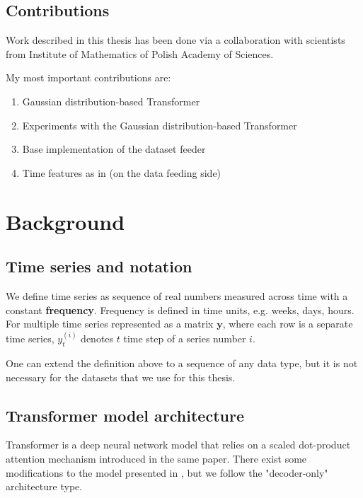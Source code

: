 \documentclass[en]{pracamgr}
\begin{document}
	
	\section*{Contributions}\label{r:contributions}
	
	Work described in this thesis has been done via a collaboration with scientists from Institute of Mathematics of Polish Academy of Sciences.
	
	My most important contributions are:
	\begin{enumerate}
		\item Gaussian distribution-based Transformer
		\item Experiments with the Gaussian distribution-based Transformer
		\item Base implementation of the dataset feeder
		\item Time features as in \cite{enhancing} (on the data feeding side)
	\end{enumerate}
	
	\chapter{Background}\label{r:background}
	
	\section{Time series and notation}
	
	We define time series as sequence of real numbers measured across time with a constant \textbf{frequency}. Frequency is defined in time units, e.g. weeks, days, hours. For multiple time series represented as a matrix $\textbf{y}$, where each row is a separate time series, $y^{(i)}_t$ denotes $t$ time step of a series number $i$.
	
	One can extend the definition above to a sequence of any data type, but it is not necessary for the datasets that we use for this thesis.
	
	
	\section{Transformer model architecture}\label{s:architecture}
	
	Transformer \cite{tr} is a deep neural network model that relies on a scaled dot-product attention mechanism introduced in the same paper. There exist some modifications to the model presented in \cite{tr}, but we follow the "decoder-only" \cite{wikipedia} architecture type.
	
\end{document}
